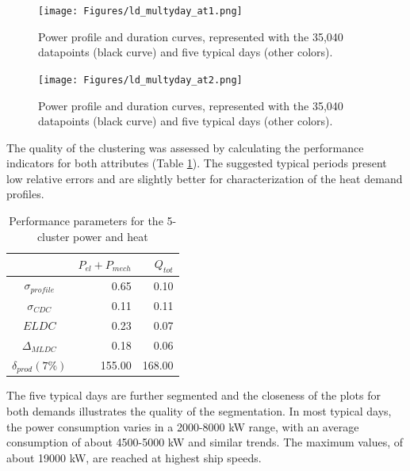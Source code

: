 \documentclass[preprint,12pt]{elsarticle}
\begin{document}
\begin{figure}
	\centering
	\texttt{[image: Figures/ld\_multyday\_at1.png]}
	\caption{Power profile and duration curves, represented with the 35,040 datapoints (black curve) and five typical days (other colors).}
	\label{fig:res:powerProfile}
\end{figure}

\begin{figure}
	\centering
		\texttt{[image: Figures/ld\_multyday\_at2.png]}
	\caption{Power profile and duration curves, represented with the 35,040 datapoints (black curve) and five typical days (other colors).}
	\label{fig:res:heatProfile}
\end{figure}

The quality of the clustering was assessed by calculating the performance indicators for both attributes (Table \ref{tab:res:clusteringKPI}). The suggested typical periods present low relative errors and are slightly better for characterization of the heat demand profiles.  
\begin{table}
	\centering
	\begin{tabular}{crr}
		\toprule 
								& $P_{el}+P_{mech}$ & $Q_{tot}$ \\
		\midrule
		$\sigma_{profile}$		&  0.65				&  0.10		\\ 
		$\sigma_{CDC}$ 			&  0.11				&  0.11		\\ 
		$ELDC$ 					&  0.23				&  0.07		\\ 
		$\Delta_{MLDC}$			&  0.18				&  0.06		\\ 
		$\delta_{prod} (7\%)$	&  155.00			&  168.00	\\ 
		\bottomrule 
		\end{tabular} 
		\caption{Performance parameters for the 5-cluster power and heat}
		\label{tab:res:clusteringKPI}
\end{table}

The five typical days are further segmented and the closeness of the plots for both demands illustrates the quality of the segmentation. In most typical days, the power consumption varies in a 2000-8000 kW range, with an average consumption of about 4500-5000 kW and similar trends. The maximum values, of about 19000 kW, are reached at highest ship speeds.   
\end{document}
